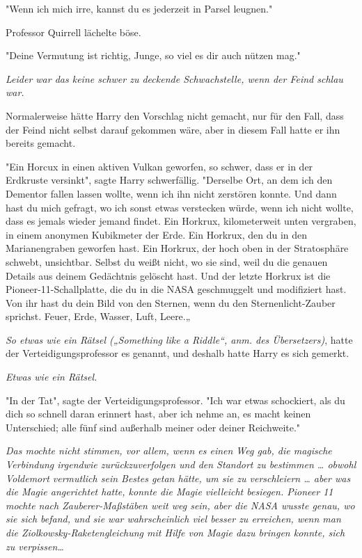 {"Wenn ich mich irre, kannst du es jederzeit in Parsel leugnen."

Professor Quirrell lächelte böse.

"Deine Vermutung ist richtig, Junge, so viel es dir auch nützen mag."

\emph{Leider war das keine schwer zu deckende Schwachstelle, wenn der Feind schlau war.}

Normalerweise hätte Harry den Vorschlag nicht gemacht, nur für den Fall, dass der Feind nicht selbst darauf gekommen wäre, aber in diesem Fall hatte er ihn bereits gemacht.

"Ein Horcux in einen aktiven Vulkan geworfen, so schwer, dass er in der Erdkruste versinkt", sagte Harry schwerfällig. "Derselbe Ort, an dem ich den Dementor fallen lassen wollte, wenn ich ihn nicht zerstören konnte. Und dann hast du mich gefragt, wo ich sonst etwas verstecken würde, wenn ich nicht wollte, dass es jemals wieder jemand findet. Ein Horkrux, kilometerweit unten vergraben, in einem anonymen Kubikmeter der Erde. Ein Horkrux, den du in den Marianengraben geworfen hast. Ein Horkrux, der hoch oben in der Stratosphäre schwebt, unsichtbar. Selbst du weißt nicht, wo sie sind, weil du die genauen Details aus deinem Gedächtnis gelöscht hast. Und der letzte Horkrux ist die Pioneer-11-Schallplatte, die du in die NASA geschmuggelt und modifiziert hast. Von ihr hast du dein Bild von den Sternen, wenn du den Sternenlicht-Zauber sprichst. Feuer, Erde, Wasser, Luft, Leere.„

\emph{So etwas wie ein Rätsel („Something like a Riddle“, anm. des Übersetzers)}, hatte der Verteidigungsprofessor es genannt, und deshalb hatte Harry es sich gemerkt.

\emph{Etwas wie ein Rätsel.}

"In der Tat", sagte der Verteidigungsprofessor. "Ich war etwas schockiert, als du dich so schnell daran erinnert hast, aber ich nehme an, es macht keinen Unterschied; alle fünf sind außerhalb meiner oder deiner Reichweite."

\emph{Das mochte nicht stimmen, vor allem, wenn es einen Weg gab, die magische Verbindung irgendwie zurückzuverfolgen und den Standort zu bestimmen … obwohl Voldemort vermutlich sein Bestes getan hätte, um sie zu verschleiern … aber was die Magie angerichtet hatte, konnte die Magie vielleicht besiegen. Pioneer 11 mochte nach Zauberer-Maßstäben weit weg sein, aber die NASA wusste genau, wo sie sich befand, und sie war wahrscheinlich viel besser zu erreichen, wenn man die Ziolkowsky-Raketengleichung mit Hilfe von Magie dazu bringen konnte, sich zu verpissen…}

}
